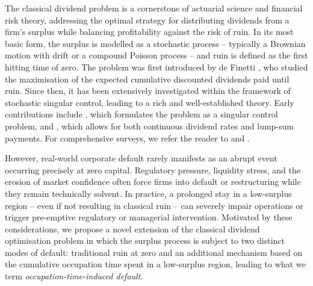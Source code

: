 \documentclass[11pt]{article} %
\numberwithin{komcounter}{section}
\numberwithin{equation}{section}
\numberwithin{theorem}{section}
\begin{document}
The classical dividend problem is a cornerstone of actuarial science and financial risk theory, addressing the optimal strategy for distributing dividends from a firm’s surplus while balancing profitability against the risk of ruin. 
In its most basic form, the surplus is modelled as a stochastic process -- typically a Brownian motion with drift or a compound Poisson process -- and ruin is defined as the first hitting time of zero. 
The problem was first introduced by de Finetti \cite{de1957impostazione}, who studied the maximisation of the expected cumulative discounted dividends paid until ruin. 
Since then, it has been extensively investigated within the framework of stochastic singular control, leading to a rich and well-established theory. 
Early contributions include \cite{shreve1984optimal}, which formulates the problem as a singular control problem, and \cite{jeanblanc1995optimization}, which allows for both continuous dividend rates and lump-sum payments. 
For comprehensive surveys, we refer the reader to \cite{albrecher2009optimality} and \cite{schmidli2007stochastic}.

However, real-world corporate default rarely manifests as an abrupt event occurring precisely at zero capital. 
Regulatory pressure, liquidity stress, and the erosion of market confidence often force firms into default or restructuring while they remain technically solvent. 
In practice, a prolonged stay in a low-surplus region -- even if not resulting in classical ruin -- can severely impair operations or trigger pre-emptive regulatory or managerial intervention. 
Motivated by these considerations, we propose a novel extension of the classical dividend optimisation problem in which the surplus process is subject to two distinct modes of default: traditional ruin at zero and an additional mechanism based on the cumulative occupation time spent in a low-surplus region, leading to what we term {\it occupation-time-induced default}.
\end{document}
